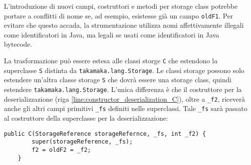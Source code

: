L'introduzione di nuovi campi, costruttori e metodi per storage class potrebbe portare a conflitti di nome se, ad esempio, esistesse già un campo \lstinline|oldF1|. Per evitare che questo accada, la strumentazione utilizza nomi affettivamente illegali come identificatori in Java, ma legali se usati come identificatori in Java bytecode.

La trasformazione può essere estesa alle classi storge \lstinline|C| che estendono la superclasse \lstinline|S| distinta da \lstinline|takamaka.lang.Storage|. Le classi storage possono solo estendere un'altra classe storage \lstinline|S| che dovrà essere una storage class, quindi estendere \lstinline|takamaka.lang.Storage|. L'unica differenza è che il costruttore per la deserializzazione (riga \ref{line:constructor_deserialization_C}), oltre a \lstinline|_f2|, riceverà anche gli altri campi primitivi \lstinline|_fs| definiti nelle superclassi. Tale \lstinline|_fs| sarà passato al costruttore della superclasse per la deserializzazione:
%
\begin{lstlisting}[numbers=none,frame=none]
	public C(StorageReference storageRefernce, _fs, int _f2) {
		super(storageReference, _fs);
		f2 = oldF2 = _f2;
	}
\end{lstlisting}
%
